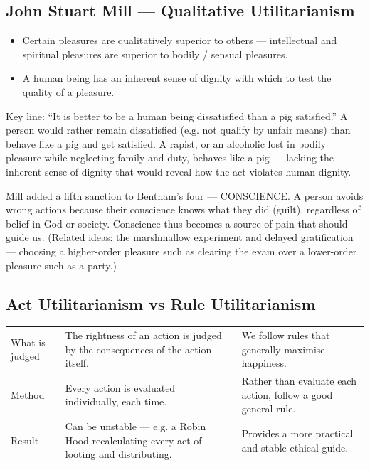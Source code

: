 \subsection{John Stuart Mill --- Qualitative Utilitarianism}

\begin{KeyConcept}
\begin{itemize}
\item Certain pleasures are qualitatively superior to others --- intellectual and spiritual pleasures are superior to bodily / sensual pleasures.
\item A human being has an inherent sense of dignity with which to test the quality of a pleasure.
\end{itemize}
\end{KeyConcept}

\begin{CriticalPoint}
Key line: ``It is better to be a human being dissatisfied than a pig satisfied.'' A person would rather remain dissatisfied (e.g. not qualify by unfair means) than behave like a pig and get satisfied. A rapist, or an alcoholic lost in bodily pleasure while neglecting family and duty, behaves like a pig --- lacking the inherent sense of dignity that would reveal how the act violates human dignity.
\end{CriticalPoint}

\begin{CriticalPoint}
Mill added a fifth sanction to Bentham's four --- CONSCIENCE. A person avoids wrong actions because their conscience knows what they did (guilt), regardless of belief in God or society. Conscience thus becomes a source of pain that should guide us. (Related ideas: the marshmallow experiment and delayed gratification --- choosing a higher-order pleasure such as clearing the exam over a lower-order pleasure such as a party.)
\end{CriticalPoint}

\subsection{Act Utilitarianism vs Rule Utilitarianism}

\begin{center}
\begin{tabularx}{\textwidth}{>{\raggedright\arraybackslash}p{2.4cm} Y Y}
 &  &  \\
\toprule
What is judged & The rightness of an action is judged by the consequences of the action itself. & We follow rules that generally maximise happiness. \\
Method & Every action is evaluated individually, each time. & Rather than evaluate each action, follow a good general rule. \\
Result & Can be unstable --- e.g. a Robin Hood recalculating every act of looting and distributing. & Provides a more practical and stable ethical guide. \\
\bottomrule
\end{tabularx}
\end{center}

